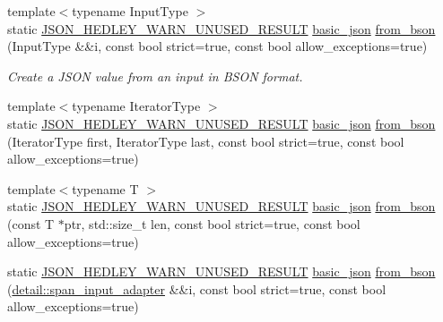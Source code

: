 \begin{DoxyCompactItemize}
\item 
{\footnotesize template$<$typename Input\+Type $>$ }\\static \hyperlink{json_8hpp_a28d7e3b2d26bd5b8a3806da3db7dea03}{J\+S\+O\+N\+\_\+\+H\+E\+D\+L\+E\+Y\+\_\+\+W\+A\+R\+N\+\_\+\+U\+N\+U\+S\+E\+D\+\_\+\+R\+E\+S\+U\+LT} \hyperlink{classnlohmann_1_1basic__json}{basic\+\_\+json} \hyperlink{classnlohmann_1_1basic__json_a4e02793f2691aa29ab7cb69fddafbf5c}{from\+\_\+bson} (Input\+Type \&\&i, const bool strict=true, const bool allow\+\_\+exceptions=true)
\begin{DoxyCompactList}\small\item\em Create a J\+S\+ON value from an input in B\+S\+ON format. \end{DoxyCompactList}\item 
{\footnotesize template$<$typename Iterator\+Type $>$ }\\static \hyperlink{json_8hpp_a28d7e3b2d26bd5b8a3806da3db7dea03}{J\+S\+O\+N\+\_\+\+H\+E\+D\+L\+E\+Y\+\_\+\+W\+A\+R\+N\+\_\+\+U\+N\+U\+S\+E\+D\+\_\+\+R\+E\+S\+U\+LT} \hyperlink{classnlohmann_1_1basic__json}{basic\+\_\+json} \hyperlink{classnlohmann_1_1basic__json_a4118d0ec23d9eeafc236b9524d220e94}{from\+\_\+bson} (Iterator\+Type first, Iterator\+Type last, const bool strict=true, const bool allow\+\_\+exceptions=true)
\item 
{\footnotesize template$<$typename T $>$ }\\static \hyperlink{json_8hpp_a28d7e3b2d26bd5b8a3806da3db7dea03}{J\+S\+O\+N\+\_\+\+H\+E\+D\+L\+E\+Y\+\_\+\+W\+A\+R\+N\+\_\+\+U\+N\+U\+S\+E\+D\+\_\+\+R\+E\+S\+U\+LT} \hyperlink{classnlohmann_1_1basic__json}{basic\+\_\+json} \hyperlink{classnlohmann_1_1basic__json_ae2612581e4788ddffc2f45d5e4cc04fc}{from\+\_\+bson} (const T $\ast$ptr, std\+::size\+\_\+t len, const bool strict=true, const bool allow\+\_\+exceptions=true)
\item 
static \hyperlink{json_8hpp_a28d7e3b2d26bd5b8a3806da3db7dea03}{J\+S\+O\+N\+\_\+\+H\+E\+D\+L\+E\+Y\+\_\+\+W\+A\+R\+N\+\_\+\+U\+N\+U\+S\+E\+D\+\_\+\+R\+E\+S\+U\+LT} \hyperlink{classnlohmann_1_1basic__json}{basic\+\_\+json} \hyperlink{classnlohmann_1_1basic__json_a2afe89884edf72412a0624982324755d}{from\+\_\+bson} (\hyperlink{classnlohmann_1_1detail_1_1span__input__adapter}{detail\+::span\+\_\+input\+\_\+adapter} \&\&i, const bool strict=true, const bool allow\+\_\+exceptions=true)
\end{DoxyCompactItemize}
